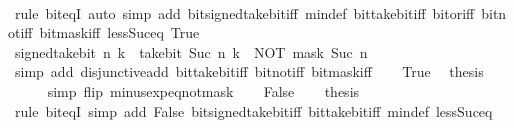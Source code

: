 \begin{isabellebody}
\ \ \ \ \isamarkupfalse%
\ {\isacharparenleft}{\kern0pt}rule\ bit{\isacharunderscore}{\kern0pt}eqI{\isacharparenright}{\kern0pt}\ {\isacharparenleft}{\kern0pt}auto\ simp\ add{\isacharcolon}{\kern0pt}\ bit{\isacharunderscore}{\kern0pt}signed{\isacharunderscore}{\kern0pt}take{\isacharunderscore}{\kern0pt}bit{\isacharunderscore}{\kern0pt}iff\ min{\isacharunderscore}{\kern0pt}def\ bit{\isacharunderscore}{\kern0pt}take{\isacharunderscore}{\kern0pt}bit{\isacharunderscore}{\kern0pt}iff\ bit{\isacharunderscore}{\kern0pt}or{\isacharunderscore}{\kern0pt}iff\ bit{\isacharunderscore}{\kern0pt}not{\isacharunderscore}{\kern0pt}iff\ bit{\isacharunderscore}{\kern0pt}mask{\isacharunderscore}{\kern0pt}iff\ less{\isacharunderscore}{\kern0pt}Suc{\isacharunderscore}{\kern0pt}eq\ True{\isacharparenright}{\kern0pt}\isanewline
\ \ \isamarkupfalse%
\ \isamarkupfalse%
\ {\isacartoucheopen}signed{\isacharunderscore}{\kern0pt}take{\isacharunderscore}{\kern0pt}bit\ n\ k\ {\isacharequal}{\kern0pt}\ take{\isacharunderscore}{\kern0pt}bit\ {\isacharparenleft}{\kern0pt}Suc\ n{\isacharparenright}{\kern0pt}\ k\ {\isacharplus}{\kern0pt}\ NOT\ {\isacharparenleft}{\kern0pt}mask\ {\isacharparenleft}{\kern0pt}Suc\ n{\isacharparenright}{\kern0pt}{\isacharparenright}{\kern0pt}{\isacartoucheclose}\isanewline
\ \ \ \ \isamarkupfalse%
\ {\isacharparenleft}{\kern0pt}simp\ add{\isacharcolon}{\kern0pt}\ disjunctive{\isacharunderscore}{\kern0pt}add\ bit{\isacharunderscore}{\kern0pt}take{\isacharunderscore}{\kern0pt}bit{\isacharunderscore}{\kern0pt}iff\ bit{\isacharunderscore}{\kern0pt}not{\isacharunderscore}{\kern0pt}iff\ bit{\isacharunderscore}{\kern0pt}mask{\isacharunderscore}{\kern0pt}iff{\isacharparenright}{\kern0pt}\isanewline
\ \ \isamarkupfalse%
\ True\ \isamarkupfalse%
\ {\isacharquery}{\kern0pt}thesis\isanewline
\ \ \ \ \isamarkupfalse%
\ {\isacharparenleft}{\kern0pt}simp\ flip{\isacharcolon}{\kern0pt}\ minus{\isacharunderscore}{\kern0pt}exp{\isacharunderscore}{\kern0pt}eq{\isacharunderscore}{\kern0pt}not{\isacharunderscore}{\kern0pt}mask{\isacharparenright}{\kern0pt}\isanewline
{}\isamarkupfalse%
\isanewline
\ \ \isamarkupfalse%
\ False\isanewline
\ \ \isamarkupfalse%
\ {\isacharquery}{\kern0pt}thesis\isanewline
\ \ \ \ \isamarkupfalse%
\ {\isacharparenleft}{\kern0pt}rule\ bit{\isacharunderscore}{\kern0pt}eqI{\isacharparenright}{\kern0pt}\ {\isacharparenleft}{\kern0pt}simp\ add{\isacharcolon}{\kern0pt}\ False\ bit{\isacharunderscore}{\kern0pt}signed{\isacharunderscore}{\kern0pt}take{\isacharunderscore}{\kern0pt}bit{\isacharunderscore}{\kern0pt}iff\ bit{\isacharunderscore}{\kern0pt}take{\isacharunderscore}{\kern0pt}bit{\isacharunderscore}{\kern0pt}iff\ min{\isacharunderscore}{\kern0pt}def\ less{\isacharunderscore}{\kern0pt}Suc{\isacharunderscore}{\kern0pt}eq{\isacharparenright}{\kern0pt}\isanewline

\end{isabellebody}
